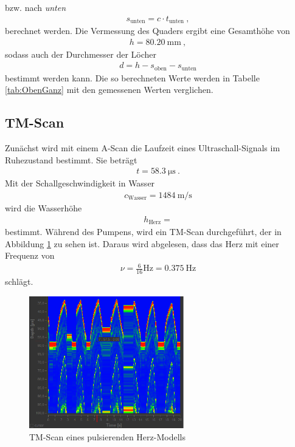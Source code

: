bzw. nach \emph{unten}
\begin{align}
	s_\text{unten} = c \cdot t_\text{unten} \ ,
\end{align}
berechnet werden. Die Vermessung des Quaders ergibt eine Gesamthöhe von
\begin{align}
	h = \SI{80.20}{\milli\meter} \ ,
\end{align}
sodass auch der Durchmesser der Löcher
\begin{align}
	d = h - s_\text{oben} - s_\text{unten}
\end{align}
bestimmt werden kann. Die so berechneten Werte werden in Tabelle \ref{tab:ObenGanz} mit den gemessenen Werten verglichen.

\clearpage
\subsection{TM-Scan}
Zunächst wird mit einem A-Scan die Laufzeit eines Ultraschall-Signals im Ruhezustand bestimmt. Sie beträgt
\begin{align}
	t = \SI{58.3}{\micro\second} \ .
\end{align}
Mit der Schallgeschwindigkeit in Wasser
\begin{align}
	c_\text{Wasser} = \SI{1484}{\meter\per\second}
\end{align}
 wird die Wasserhöhe
\begin{align}
	h_\text{Herz} = 
\end{align}
bestimmt. Während des Pumpens, wird ein TM-Scan durchgeführt, der in Abbildung \ref{fig:Herz} zu sehen ist. Daraus wird abgelesen, dass das Herz mit einer Frequenz von
\begin{align}
	\nu = \frac{6}{16}\si{\hertz} = \SI{0.375}{\hertz}
\end{align}
\grqq schlägt\grqq.
\begin{figure}[h!]
	\centering
	\includegraphics[width=0.6\textwidth]{TimeScan.png}
	\caption{TM-Scan eines pulsierenden Herz-Modells}
	\label{fig:Herz}
\end{figure} \\
